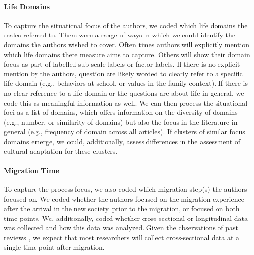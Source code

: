 \documentclass[man, 12pt, a4paper]{apa7}
\begin{document}
\paragraph{Life Domains}
To capture the situational focus of the authors, we coded which life domains the scales referred to. There were a range of ways in which we could identify the domains the authors wished to cover. Often times authors will explicitly mention which life domains there measure aims to capture. Others will show their domain focus as part of labelled sub-scale labels or factor labels. If there is no explicit mention by the authors, question are likely worded to clearly refer to a specific life domain (e.g., behaviors at school, or values in the family context). If there is no clear reference to a life domain or the questions are about life in general, we code this as meaningful information as well. We can then process the situational foci as a list of domains, which offers information on the diversity of domains (e.g., number, or similarity of domains) but also the focus in the literature in general (e.g., frequency of domain across all articles). If clusters of similar focus domains emerge, we could, additionally, assess differences in the assessment of cultural adaptation for these clusters.

\paragraph{Migration Time}
To capture the process focus, we also coded which migration step(s) the authors focused on. We coded whether the authors focused on the migration experience after the arrival in the new society, prior to the migration, or focused on both time points. We, additionally, coded whether cross-sectional or longitudinal data was collected and how this data was analyzed. Given the observations of past reviews \citep[e.g.,][]{Brown2011, Ward2019}, we expect that most researchers will collect cross-sectional data at a single time-point after migration.


\end{document}
